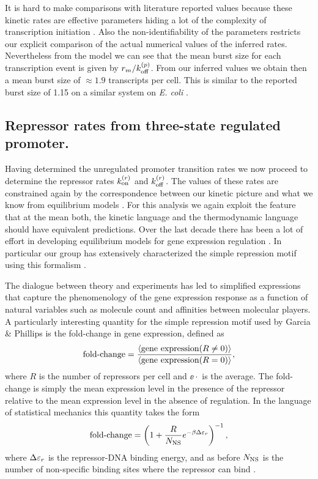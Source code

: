 It is hard to make comparisons with literature reported values because these
kinetic rates are effective parameters hiding a lot of the complexity of
transcription initiation \cite{Browning2004}. Also the non-identifiability of
the parameters restricts our explicit comparison of the actual numerical values
of the inferred rates. Nevertheless from the model we can see that the mean
burst  size for each transcription event is given by $r_m / k^{(p)}_{\text{off}}$. From our
inferred values we obtain then a mean burst size of $\approx 1.9$ transcripts
per cell. This is similar to the reported burst size of 1.15 on a similar system
on \textit{E. coli} \cite{Yu2006}.

\subsection{Repressor rates from three-state regulated promoter.}

Having determined the unregulated promoter transition rates we now proceed to
determine the repressor rates $k^{(r)}_{\text{on}}$ and $k^{(r)}_{\text{off}}$. The values of these rates
are constrained again by the correspondence between our kinetic picture and what
we know from equilibrium models \cite{Phillips2015}. For this analysis we again
exploit the feature that at the mean both, the kinetic language and the
thermodynamic language should have equivalent predictions. Over the last decade
there has been a lot of effort in developing equilibrium models for gene
expression regulation \cite{Buchler2003, Vilar2011, Bintu2005a}. In particular
our group has extensively characterized the simple repression motif using this
formalism \cite{Garcia2011c, Brewster2014, Razo-Mejia2018}.

The dialogue between theory and experiments has led to simplified expressions
that capture the phenomenology of the gene expression response as a function of
natural variables such as molecule count and affinities between molecular
players. A particularly interesting quantity for the simple repression motif
used by Garcia \& Phillips \cite{Garcia2011c} is the fold-change in gene
expression, defined as
\begin{equation}
  \text{fold-change} = {\left\langle \text{gene expression}(R \neq 0) \right\rangle \over
                 \left\langle \text{gene expression}(R = 0) \right\rangle},
\end{equation}
where $R$ is the number of repressors per cell and $\ee{\cdot}$ is the average.
The fold-change is simply the mean expression level in the presence of the
repressor relative to the mean expression level in the absence of regulation. In
the language of statistical mechanics this quantity takes the form
\begin{equation}
  \text{fold-change} = \left( 1 + {R \over N_\text{NS}} e^{-\beta\Delta\varepsilon_r} \right)^{-1},
  \label{seq_fc_thermo}
\end{equation}
where $\Delta\varepsilon_r$ is the repressor-DNA binding energy, and as before $N_\text{NS}$ is the
number of non-specific binding sites where the repressor can bind
\cite{Garcia2011c}.

